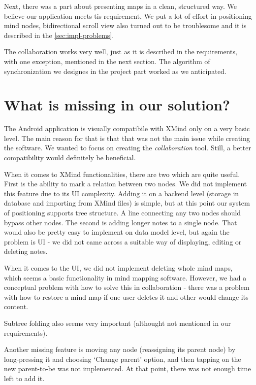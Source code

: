 Next, there was a part about presenting maps in a clean, structured way. We believe our application meets tis requirement. We put a lot of effort in positioning mind nodes, bidirectional scroll view also turned out to be troublesome and it is described in the \cref{sec:impl-problems}.

The collaboration works very well, just as it is described in the requirements, with one exception, mentioned in the next section. The algorithm of synchronization we designes in the project part worked  as we anticipated. 

\section{What is missing in our solution?}
\label{sec:summary-missing}
The Android application is visually compatibile with XMind only on a very basic level. The main reason for that is that that was not the main issue while creating the software. We wanted to focus on creating the \emph{collaboration} tool. Still, a better compatibility would definitely be beneficial. 

When it comes to XMind functionalities, there are two which are quite useful. First is the ability to mark a relation between two nodes. We did not implement this feature due to its UI complexity. Adding it on a backend level (storage in database and importing from XMind files) is simple, but at this point our system of positioning supports tree structure. A line connecting any two nodes should  bypass other nodes. The second is adding longer notes to a single node. That would also be pretty easy to implement on data model level, but again the problem is UI - we did not came across a suitable way of displaying, editing or deleting notes.

When it comes to the UI, we did not implement deleting whole mind maps, which seems a basic functionality in mind mapping software. However, we had a conceptual problem with how to solve this in collaboration - there was a problem with how to restore a mind map if one user deletes it and other would change its content.

 Subtree folding also seems very important (althought not mentioned in our requirements). 
 
 Another missing feature is moving any node (reassigning its parent node) by long-pressing it and choosing `Change parent' option, and then tapping on the new parent-to-be was not implemented. At that point, there was not enough time left to add it.

